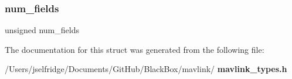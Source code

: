\mbox{\label{struct____mavlink__message__info_a4c772f3cf58e986ee1450ef3e73e56f2}} 
\subsubsection{num\+\_\+fields}
{\footnotesize\ttfamily unsigned num\+\_\+fields}



The documentation for this struct was generated from the following file\+:\begin{DoxyCompactItemize}
\item 
/\+Users/jselfridge/\+Documents/\+Git\+Hub/\+Black\+Box/mavlink/\textbf{ mavlink\+\_\+types.\+h}\end{DoxyCompactItemize}
